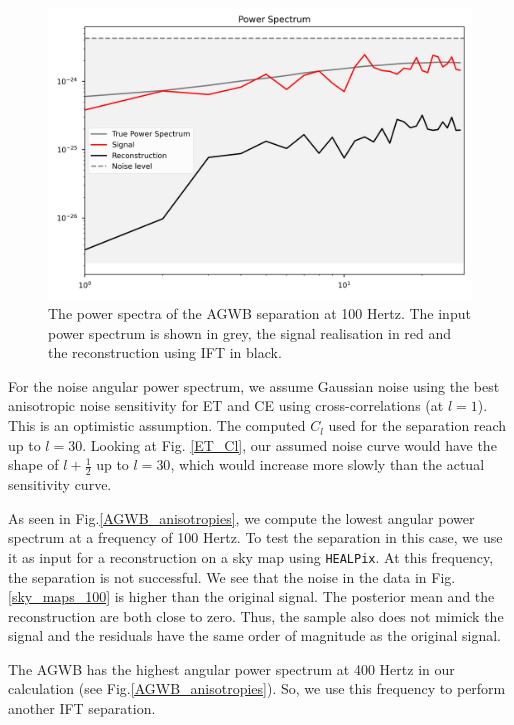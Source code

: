 \begin{figure}[h]
    \centering
    \includegraphics[width=0.8\linewidth]{Images/power_spectrum_100Hz_2D.png}
    \caption{The power spectra of the AGWB separation at 100 Hertz. The input power spectrum is shown in grey, the signal realisation in red and the reconstruction using IFT in black.}
    \label{100Hz_power_spectrum}
\end{figure} 

For the noise angular power spectrum, we assume Gaussian noise using the best anisotropic noise sensitivity for ET and CE using cross-correlations (at $l=1$). This is an optimistic assumption. The computed $C_l$ used for the separation reach up to $l=30$. Looking at Fig. \ref{ET_Cl}, our assumed noise curve would have the shape of $l+\frac{1}{2}$ up to $l=30$, which would increase more slowly than the actual sensitivity curve. 

As seen in Fig.\ref{AGWB_anisotropies}, we compute the lowest angular power spectrum at a frequency of 100 Hertz. To test the separation in this case, we use it as input for a reconstruction on a sky map using {\tt HEALPix}\cite{todo, healpix}. At this frequency, the separation is not successful. We see that the noise in the data in Fig.\ref{sky_maps_100} is higher than the original signal. The posterior mean and the reconstruction are both close to zero. Thus, the sample also does not mimick the signal and the residuals have the same order of magnitude as the original signal.


The AGWB has the highest angular power spectrum at 400 Hertz in our calculation (see Fig.\ref{AGWB_anisotropies}). So, we use this frequency to perform another IFT separation.

